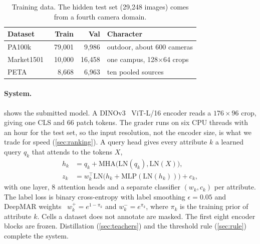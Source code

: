 \documentclass[10pt,twocolumn,letterpaper]{article}
\begin{document}
\begin{table}[t]
\centering\small
\setlength{\tabcolsep}{4pt}
\begin{tabular}{@{}lrrl@{}}
\toprule
Dataset & Train & Val & Character \\
\midrule
PA100k~\cite{pa100k} & 79{,}001 & 9{,}986 & outdoor, about 600 cameras \\
Market1501~\cite{market,marketattr} & 10{,}000 & 16{,}458 & one campus, 128$\times$64 crops \\
PETA~\cite{peta} & 8{,}668 & 6{,}963 & ten pooled sources \\
\bottomrule
\end{tabular}
\caption{Training data. The hidden test set (29{,}248 images) comes from a fourth camera domain.}
\label{tab:data}
\end{table}

\paragraph{System.}  shows the submitted model. A DINOv3~\cite{dinov3} ViT-L/16 encoder reads a $176\times96$ crop, giving one CLS and 66 patch tokens. The grader runs on six CPU threads with an hour for the test set, so the input resolution, not the encoder size, is what we trade for speed (\cref{sec:ranking}). A query head gives every attribute $k$ a learned query $q_k$ that attends to the tokens $X$,
\begin{align}
h_k&=q_k+\mathrm{MHA}\big(\mathrm{LN}(q_k),\mathrm{LN}(X)\big),\\
z_k&=w_k^{\top}\mathrm{LN}\big(h_k+\mathrm{MLP}(\mathrm{LN}(h_k))\big)+c_k ,
\end{align}
with one layer, 8 attention heads and a separate classifier $(w_k,c_k)$ per attribute. The label loss is binary cross-entropy with label smoothing $\epsilon=0.05$ and DeepMAR weights~\cite{deepmar} $w_k^+=e^{1-\pi_k}$ and $w_k^-=e^{\pi_k}$, where $\pi_k$ is the training prior of attribute $k$. Cells a dataset does not annotate are masked. The first eight encoder blocks are frozen. Distillation (\cref{sec:teachers}) and the threshold rule (\cref{sec:rule}) complete the system.
\end{document}
